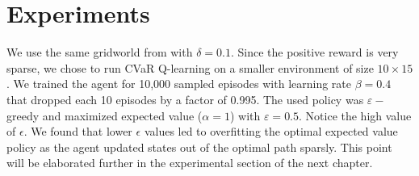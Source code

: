
%    		


%    
%		
%	


\newpage

\section{Experiments}\label{sec:qexperiments}
We use the same gridworld from  with $\delta=0.1$. Since the positive reward is very sparse, we chose to run CVaR Q-learning on a smaller environment of size $10\times15$. We trained the agent for 10,000 sampled episodes with learning rate $\beta=0.4$ that dropped each 10 episodes by a factor of 0.995. The used policy was $\varepsilon-$greedy and maximized expected value ($\alpha=1$) with $\varepsilon=0.5$. Notice the high value of $\epsilon$. We found that lower $\epsilon$ values led to overfitting the optimal expected value policy as the agent updated states out of the optimal path sparsly. This point will be elaborated further in the experimental section of the next chapter.

